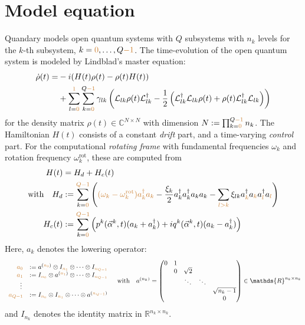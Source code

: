 \documentclass[letterpaper]{article}
\newcommand{\YC}[1]{{\textcolor{Bronze}{#1}}}
\newcommand{\Ell}{\mathcal{L}}
\newcommand{\R}{\mathds{R}}
\newcommand{\C}{\mathds{C}}
\begin{document}
\section{Model equation}
Quandary models open quantum systems with $Q$ subsystems with $n_k$ levels for the
$k$-th subsystem, $k=\YC{0},\dots,Q\YC{-1}$. The time-evolution of the open quantum system is modeled by Lindblad's master equation:
\begin{align}\label{mastereq}
  \dot \rho(t) = &-i(H(t)\rho(t) - \rho(t)H(t)) \notag \\
  &+ \sum_{l=\YC{0}}^{\YC{1}} \sum_{k=\YC{0}}^{Q\YC{-1}} \gamma_{lk} \left( \Ell_{lk} \rho(t)
  \Ell_{lk}^{\dagger} - \frac 1 2 \left( \Ell_{lk}^{\dagger}\Ell_{lk}
  \rho(t) + \rho(t)\Ell_{lk}^{\dagger} \Ell_{lk}\right) \right)
\end{align}
for the density matrix $\rho(t)\in \C^{N\times N}$ with dimension $N :=
\prod_{k=\YC{0}}^{Q\YC{-1}} n_k$. The Hamiltonian $H(t)$ consists of a constant \textit{drift}
part, and a time-varying \textit{control} part. For the computational
\textit{rotating frame} \YC{with fundamental frequencies $\omega_k$ and rotation
frequency $\omega_k^{\text{rot}}$}, these are computed from
\begin{align}
  H(t) &= H_d + H_c(t) \\
  \text{with} \quad H_d &:= \sum_{k=\YC{0}}^{\YC{Q-1}} \left(\YC{(\omega_k -                                 
  \omega_k^{\text{rot}})a_k^{\dagger}a_k}- \frac{\xi_k}{2}
  a_k^{\dagger}a_k^{\dagger}a_k a_k - \sum_{\YC{l> k}} \xi_{lk}
  a_{\YC{k}}^{\dagger}a_{\YC{k}}
  a_{\YC{l}}^{\dagger} a_{\YC{l}} \right) \\
   H_c(t) &:= \sum_{k=\YC{0}}^{\YC{Q-1}} \left( p^k(\vec{\alpha}^k,t) (a_k +
   a_k^{\dagger}) + i q^k(\vec{\alpha}^k,t)(a_k - a_k^{\dagger})
   \right)
\end{align}
Here, $a_k$ denotes the lowering operator:
\begin{align}
  \begin{array}{rl}
  \YC{a_0} &:= a^{(\YC{n_0})} \otimes I_{\YC{n_1}} \otimes \dots \otimes
  I_{\YC{n_{Q-1}}}\\
  \YC{a_1} &:= I_{\YC{n_0}} \otimes a^{(\YC{n_1})} \otimes \dots \otimes
  I_{\YC{n_{Q-1}}}\\
  \vdots \, & \\
  \YC{a_{Q-1}} &:= I_{\YC{n_0}} \otimes I_{\YC{n_1}} \otimes \dots \otimes
  a^{(\YC{n_{Q-1}})}\\
  \end{array}
  \quad \text{with}\quad
 a^{(n_k)} = \begin{pmatrix}
   0 & 1 &          &         &    \\
     & 0 & \sqrt{2} &         &     \\
     &   & \ddots   & \ddots  &    \\
     &   &          &         & \sqrt{n_k-1}  \\
     &   &          &         & 0   
 \end{pmatrix} \in \R^{n_k \times n_k}
\end{align}
and $I_{n_k}$ denotes the identity matrix in $\R^{n_k \times n_k}$.
\end{document}
